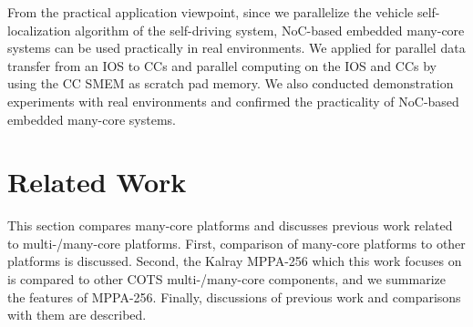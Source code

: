 From the practical application viewpoint, since we parallelize the vehicle self-localization algorithm of the self-driving system, NoC-based embedded many-core systems can be used practically in real environments.
We applied for parallel data transfer from an IOS to CCs and parallel computing on the IOS and CCs by using the CC SMEM as scratch pad memory.    
We also conducted demonstration experiments with real environments and confirmed the practicality of NoC-based embedded many-core systems.

\chapter{Related Work}
\label{chap:related_work}
This section compares many-core platforms and discusses previous work related to multi-/many-core platforms.
First, comparison of many-core platforms to other platforms is discussed.
Second, the Kalray MPPA-256 which this work focuses on is compared to other COTS multi-/many-core components, and we summarize the features of MPPA-256.
Finally, discussions of previous work and comparisons with them are described.


